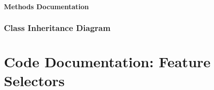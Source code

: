 \documentclass[letterpaper,10pt,english]{sphinxmanual}
\begin{document}
\begin{fulllineitems}
\subsubsection*{Methods Documentation}

\begin{fulllineitems}
\label{\detokenize{api/mastml.feature_generators.PolynomialFeatureGenerator:mastml.feature_generators.PolynomialFeatureGenerator.fit}}
\end{fulllineitems}


\begin{fulllineitems}
\label{\detokenize{api/mastml.feature_generators.PolynomialFeatureGenerator:mastml.feature_generators.PolynomialFeatureGenerator.transform}}
\end{fulllineitems}


\end{fulllineitems}



\subsection{Class Inheritance Diagram}
\label{\detokenize{5_feature_generators:class-inheritance-diagram}}


\chapter{Code Documentation: Feature Selectors}
\label{\detokenize{6_feature_selectors:code-documentation-feature-selectors}}\label{\detokenize{6_feature_selectors::doc}}
\end{document}
